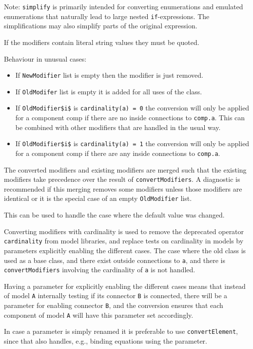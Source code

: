 \begin{nonnormative}
Note: \lstinline!simplify! is primarily intended for converting enumerations and emulated enumerations that naturally lead to large nested \lstinline!if!-expressions.
The simplifications may also simplify parts of the original expression.
\end{nonnormative}

If the modifiers contain literal string values they must be quoted.

Behaviour in unusual cases:
\begin{itemize}
\item
  If \lstinline!NewModifier! list is empty then the modifier is just removed.
\item
  If \lstinline!OldModifer! list is empty it is added for all uses of the class.
\item
  If \lstinline!OldModifier$i$! is \lstinline!cardinality(a) = 0! the conversion will only be applied for a component comp if there are no inside connections to \lstinline!comp.a!.
  This can be combined with other modifiers that are handled in the usual way.
\item
  If \lstinline!OldModifier$i$! is \lstinline!cardinality(a) = 1! the conversion will only be applied for a component comp if there are any inside connections to \lstinline!comp.a!.
\end{itemize}

The converted modifiers and existing modifiers are merged such that the existing modifiers take precedence over the result of \lstinline!convertModifiers!.
A diagnostic is recommended if this merging removes some modifiers unless those modifiers are identical or it is the special case of an empty \lstinline!OldModifier! list.
\begin{nonnormative}
This can be used to handle the case where the default value was changed.
\end{nonnormative}

Converting modifiers with cardinality is used to remove the deprecated operator \lstinline!cardinality! from model libraries, and replace tests on cardinality in models by parameters explicitly enabling the different cases.
The case where the old class is used as a base class, and there exist outside connections to \lstinline!a!, and there is \lstinline!convertModifiers! involving the cardinality of \lstinline!a! is not handled.

\begin{nonnormative}
Having a parameter for explicitly enabling the different cases means that instead of model \lstinline!A! internally testing if its connector \lstinline!B! is connected, there will be a parameter for enabling connector \lstinline!B!, and the conversion ensures that each component of model \lstinline!A! will have this parameter set accordingly.

In case a parameter is simply renamed it is preferable to use \lstinline!convertElement!, since that also handles, e.g., binding equations using the parameter.
\end{nonnormative}

